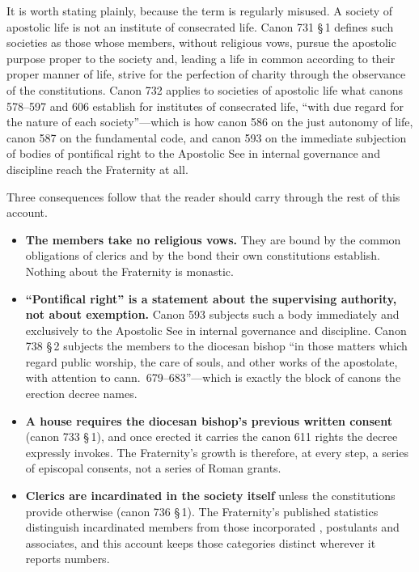 It is worth stating plainly, because the term is regularly misused. A
society of apostolic life is not an institute of consecrated life. Canon
731 §\,1 defines such societies as those whose members, without religious
vows, pursue the apostolic purpose proper to the society and, leading a
life in common according to their proper manner of life, strive for the
perfection of charity through the observance of the
constitutions. Canon 732 applies
to societies of apostolic life what canons 578--597 and 606 establish for
institutes of consecrated life, ``with due regard for the nature of each
society''---which is how canon 586 on the just autonomy of life, canon
587 on the fundamental code, and canon 593 on the immediate subjection of
bodies of pontifical right to the Apostolic See in internal governance
and discipline reach the Fraternity at all.

Three consequences follow that the reader should carry through the rest
of this account.

\begin{itemize}
\item \textbf{The members take no religious vows.} They are bound by the
common obligations of clerics and by the bond their own constitutions
establish. Nothing about the Fraternity is monastic.
\item \textbf{``Pontifical right'' is a statement about the supervising
authority, not about exemption.} Canon 593 subjects such a body
immediately and exclusively to the Apostolic See in internal governance
and discipline. Canon 738 §\,2 subjects the members to the diocesan
bishop ``in those matters which regard public worship, the care of souls,
and other works of the apostolate, with attention to cann.\
679--683''---which is exactly the block of canons the erection decree
names.
\item \textbf{A house requires the diocesan bishop's previous written
consent} (canon 733 §\,1), and once erected it carries the canon 611
rights the decree expressly invokes. The Fraternity's growth is
therefore, at every step, a series of episcopal consents, not a series of
Roman grants.
\item \textbf{Clerics are incardinated in the society itself} unless the
constitutions provide otherwise (canon 736 §\,1). The Fraternity's
published statistics distinguish incardinated members from those
incorporated \latin{ad annum}, postulants and associates, and this
account keeps those categories distinct wherever it reports numbers.
\end{itemize}

